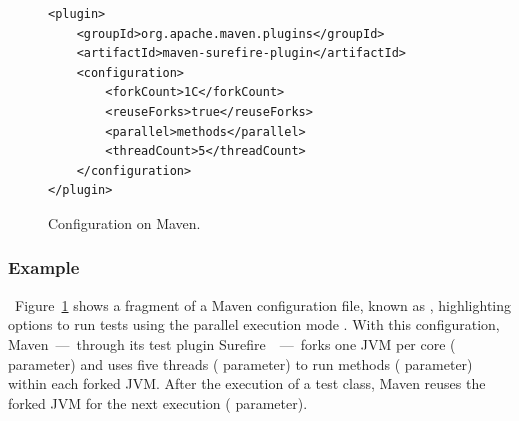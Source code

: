 




\begin{figure}[h!]
\centering
\scriptsize
{}
\begin{lstlisting}
<plugin>
    <groupId>org.apache.maven.plugins</groupId>
    <artifactId>maven-surefire-plugin</artifactId>
    <configuration>
        <forkCount>1C</forkCount>
        <reuseForks>true</reuseForks>
        <parallel>methods</parallel>
        <threadCount>5</threadCount>
    </configuration>
</plugin>
\end{lstlisting}
    \caption{\label{fig:surefire} Configuration \ForkParMeth{} on Maven.}
\end{figure}

\subsubsection*{Example}~Figure~\ref{fig:surefire} shows a
fragment of a Maven configuration file, known as \pomf{}, highlighting
options to run tests using the parallel execution mode \ForkParMeth{}.
With this configuration, Maven~---~through its test plugin
Surefire~\cite{maven-surefire-plugin}~---~forks one JVM per core
( parameter) and uses five threads
( parameter) to run methods (
parameter) within each forked JVM. After the execution of a test
class, Maven reuses the forked JVM for the next execution
( parameter).

